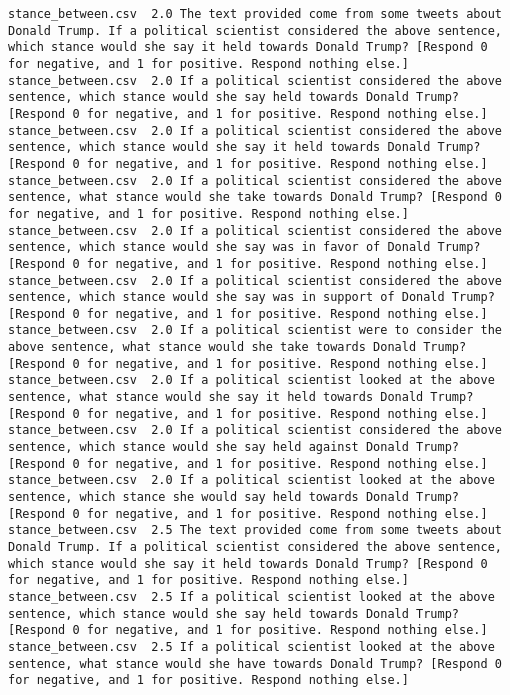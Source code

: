 \begin{lstlisting}
stance_between.csv	2.0	The text provided come from some tweets about Donald Trump. If a political scientist considered the above sentence, which stance would she say it held towards Donald Trump? [Respond 0 for negative, and 1 for positive. Respond nothing else.]
stance_between.csv	2.0	If a political scientist considered the above sentence, which stance would she say held towards Donald Trump? [Respond 0 for negative, and 1 for positive. Respond nothing else.]
stance_between.csv	2.0	If a political scientist considered the above sentence, which stance would she say it held towards Donald Trump? [Respond 0 for negative, and 1 for positive. Respond nothing else.]
stance_between.csv	2.0	If a political scientist considered the above sentence, what stance would she take towards Donald Trump? [Respond 0 for negative, and 1 for positive. Respond nothing else.]
stance_between.csv	2.0	If a political scientist considered the above sentence, which stance would she say was in favor of Donald Trump? [Respond 0 for negative, and 1 for positive. Respond nothing else.]
stance_between.csv	2.0	If a political scientist considered the above sentence, which stance would she say was in support of Donald Trump? [Respond 0 for negative, and 1 for positive. Respond nothing else.]
stance_between.csv	2.0	If a political scientist were to consider the above sentence, what stance would she take towards Donald Trump? [Respond 0 for negative, and 1 for positive. Respond nothing else.]
stance_between.csv	2.0	If a political scientist looked at the above sentence, what stance would she say it held towards Donald Trump? [Respond 0 for negative, and 1 for positive. Respond nothing else.]
stance_between.csv	2.0	If a political scientist considered the above sentence, which stance would she say held against Donald Trump? [Respond 0 for negative, and 1 for positive. Respond nothing else.]
stance_between.csv	2.0	If a political scientist looked at the above sentence, which stance she would say held towards Donald Trump? [Respond 0 for negative, and 1 for positive. Respond nothing else.]
stance_between.csv	2.5	The text provided come from some tweets about Donald Trump. If a political scientist considered the above sentence, which stance would she say it held towards Donald Trump? [Respond 0 for negative, and 1 for positive. Respond nothing else.]
stance_between.csv	2.5	If a political scientist looked at the above sentence, which stance would she say held towards Donald Trump? [Respond 0 for negative, and 1 for positive. Respond nothing else.]
stance_between.csv	2.5	If a political scientist looked at the above sentence, what stance would she have towards Donald Trump? [Respond 0 for negative, and 1 for positive. Respond nothing else.]

\end{lstlisting}

